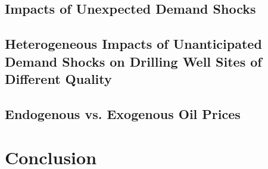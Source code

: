 \subsection{Impacts of Unexpected Demand Shocks}
\label{C3-SubSection:Impacts-of-Unexpected-Demand-Shocks}


\subsection{Heterogeneous Impacts of Unanticipated Demand Shocks on Drilling Well Sites of Different Quality}
\label{C3-SubSection:Heterogeneous-Impacts-of-Unanticipated-Demand-Shocks-on-Drilling-Well-Sites-of-Different-Quality}


\subsection{Endogenous vs. Exogenous Oil Prices}
\label{C3-SubSection:Endogenous-vs-Exogenous-Oil-Prices}




%



%



\section{Conclusion}
\label{C3-Section:Conclusion}




%
